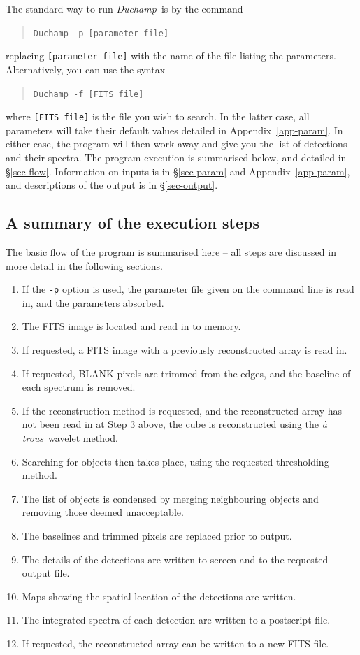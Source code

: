 \documentclass[12pt,a4paper]{article}
\newcommand{\duchamp}{\emph{Duchamp}}
\newcommand{\atrous}{\textit{{\`a} trous}}
\begin{document}
The standard way to run \duchamp\ is by the command
\begin{quote}
\texttt{Duchamp -p [parameter file]}
\end{quote}
replacing \texttt{[parameter file]} with the name of the file listing
the parameters. Alternatively, you can use the syntax
\begin{quote}
\texttt{Duchamp -f [FITS file]}
\end{quote}
where \texttt{[FITS file]} is the file you wish to search. In the latter
case, all parameters will take their default values detailed in
Appendix~\ref{app-param}. In either case, the program will then work
away and give you the list of detections and their spectra. The
program execution is summarised below, and detailed in
\S\ref{sec-flow}. Information on inputs is in \S\ref{sec-param} and
Appendix~\ref{app-param}, and descriptions of the output is in
\S\ref{sec-output}.

\subsection{A summary of the execution steps}

The basic flow of the program is summarised here -- all steps are
discussed in more detail in the following sections.
\begin{enumerate}
\item If the \texttt{-p} option is used, the parameter file given on
  the command line is read in, and the parameters absorbed.
\item The FITS image is located and read in to memory.
\item If requested, a FITS image with a previously reconstructed array
  is read in.
\item If requested, BLANK pixels are trimmed from the edges, and
  the baseline of each spectrum is removed.
\item If the reconstruction method is requested, and the reconstructed
  array has not been read in at Step 3 above, the cube is
  reconstructed using the \atrous\ wavelet method.
\item Searching for objects then takes place, using the requested
  thresholding method.
\item The list of objects is condensed by merging neighbouring objects
  and removing those deemed unacceptable.
\item The baselines and trimmed pixels are replaced prior to output.
\item The details of the detections are written to screen and to the
  requested output file.
\item Maps showing the spatial location of the detections are written.
\item The integrated spectra of each detection are written to a
  postscript file. 
\item If requested, the reconstructed array can be written to a new
  FITS file.
\end{enumerate}
\end{document}
